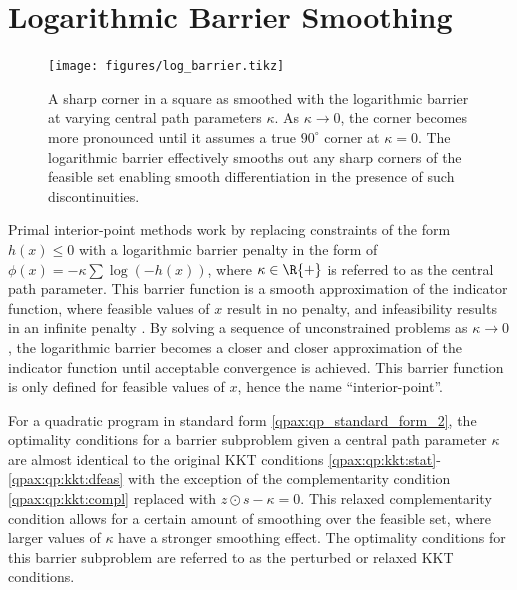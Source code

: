 \section{Logarithmic Barrier Smoothing}
%
%
%
%
\begin{figure}[t!]
    \centering
    \hspace{0cm}
    \texttt{[image: figures/log\_barrier.tikz]}
    \caption{A sharp corner in a square as smoothed with the logarithmic barrier at varying central path parameters $\kappa$. As $\kappa \rightarrow 0$, the corner becomes more pronounced until it assumes a true $90^\circ$ corner at $\kappa = 0$. The logarithmic barrier effectively smooths out any sharp corners of the feasible set enabling smooth differentiation in the presence of such discontinuities.}
    \label{qpax:fig:log_barrier}
\end{figure}
Primal interior-point methods work by replacing constraints of the form $h(x) \leq 0$ with a logarithmic barrier penalty in the form of $\phi(x) = - \kappa \sum \log(-h(x))$, where $\kappa \in \R{+}$ is referred to as the central path parameter. This barrier function is a smooth approximation of the indicator function, where feasible values of $x$ result in no penalty, and infeasibility results in an infinite penalty \cite{boyd2004}. By solving a sequence of unconstrained problems as $\kappa \rightarrow 0$, the logarithmic barrier becomes a closer and closer approximation of the indicator function until acceptable convergence is achieved. This barrier function is only defined for feasible values of $x$, hence the name ``interior-point''. 

For a quadratic program in standard form \eqref{qpax:qp_standard_form_2}, the optimality conditions for a barrier subproblem given a central path parameter $\kappa$ are 
almost identical to the original KKT conditions \eqref{qpax:qp:kkt:stat}-\eqref{qpax:qp:kkt:dfeas} with the exception of the complementarity condition \eqref{qpax:qp:kkt:compl} replaced with $z \odot s - \kappa = 0$.  This relaxed complementarity condition allows for a certain amount of smoothing over the feasible set, where larger values of $\kappa$ have a stronger smoothing effect. The optimality conditions for this barrier subproblem are referred to as the perturbed or relaxed KKT conditions. 
%
